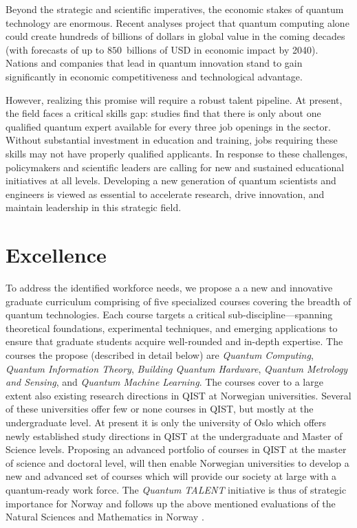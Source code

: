 \documentclass{scrreprt}
\begin{document}
Beyond the strategic and scientific imperatives, the economic stakes
of quantum technology are enormous. Recent analyses project that
quantum computing alone could create hundreds of billions of dollars
in global value in the coming decades \cite{forecast} (with forecasts of up to
$850$~billions of USD in economic impact by 2040). Nations and companies that
lead in quantum innovation stand to gain significantly in economic
competitiveness and technological advantage.

However, realizing this promise will require a robust talent
pipeline. At present, the field faces a critical skills gap: studies
find that there is only about one qualified quantum expert available
for every three job openings in the sector. Without substantial
investment in education and training, jobs requiring these skills may not have properly qualified applicants. In response to these challenges, policymakers
and scientific leaders are calling for new and sustained educational
initiatives at all levels. Developing a new generation of quantum
scientists and engineers is viewed as essential to accelerate
research, drive innovation, and maintain leadership in this strategic
field.



\section{Excellence}


To address the identified workforce needs, we propose a a new and innovative graduate
curriculum comprising of five specialized courses covering the breadth of
quantum technologies. Each course targets a critical
sub-discipline—spanning theoretical foundations, experimental
techniques, and emerging applications to ensure that graduate students acquire
well-rounded and in-depth expertise. The courses the propose (described in detail below) are
\textit{Quantum Computing}, \textit{Quantum Information Theory}, \textit{Building Quantum Hardware},
\textit{Quantum Metrology and Sensing}, and \textit{Quantum Machine Learning}. The courses cover to a large extent also existing research directions in QIST at Norwegian universities. Several of these universities offer few or none courses in QIST, but mostly at the undergraduate level. At present it is only the university of Oslo which offers newly established study directions in QIST at the undergraduate and Master of Science levels. Proposing an advanced portfolio of courses in QIST at the master of science and doctoral level, will then enable Norwegian  universities to develop a new and advanced set of courses which will provide our society at large with a quantum-ready work force. The \textit{Quantum TALENT} initiative is thus of strategic importance for Norway and follows up the above mentioned evaluations of the Natural Sciences and Mathematics in Norway \cite{evalnat,evalmat}.
\end{document}
